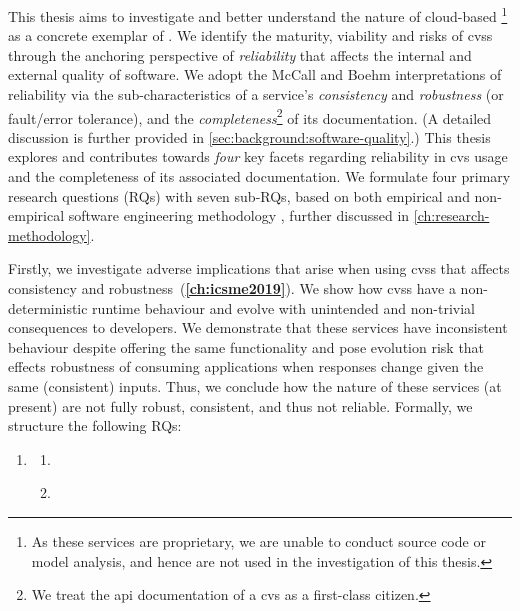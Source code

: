 This thesis aims to investigate and better understand the nature of cloud-based \footnote{As these services are proprietary, we are unable to conduct source code or model analysis, and hence are not used in the investigation of this thesis.} as a concrete exemplar of .
We identify the maturity, viability and risks of \glspl{cvs} through the anchoring perspective of \textit{reliability} that affects the internal and external quality of software. We adopt the McCall \citep{McCall:1977uy} and Boehm \citep{Boehm:1978vv} interpretations of reliability via the sub-characteristics of a service's \textit{consistency} and \textit{robustness} (or fault/error tolerance), and the \textit{completeness}\footnote{We treat the \gls{api} documentation of a \gls{cvs} as a first-class citizen.} of its documentation. (A detailed discussion is further provided in \cref{sec:background:software-quality}.)
This thesis explores and contributes towards \textit{four} key facets regarding reliability in \gls{cvs} usage and the completeness of its associated documentation. We formulate four primary research questions (RQs) with seven sub-RQs, based on both empirical and non-empirical software engineering methodology \citep{Simon:1996uw}, further discussed in \cref{ch:research-methodology}.

Firstly, we investigate adverse implications that arise when using \glspl{cvs} that affects consistency and robustness~(\textbf{\cref{ch:icsme2019}}). We show how \glspl{cvs} have a non-deterministic runtime behaviour and evolve with unintended and non-trivial consequences to developers. We demonstrate that these services have inconsistent behaviour despite offering the same functionality and pose evolution risk that effects robustness of consuming applications when responses change given the same (consistent) inputs. Thus, we conclude how the nature of these services (at present) are not fully robust, consistent, and thus not reliable. Formally, we structure the following RQs:

\begin{leftbar}
\begin{enumerate}[label=\faQuestionCircle~~\textbf{RQ\arabic*.}, ref=RQ\arabic*, leftmargin=2.5\parindent, rightmargin=1\parindent]
    \item \textbf{\RQOneTextLandscapeAnalysis{}}\label{rq:nature}
    \begin{enumerate}[label=\textit{RQ1.\arabic*.}, ref=RQ1.\arabic*]
      \item \RQOneTextLandscapeAnalysisRuntime{}\label{rq:nature:runtime}
      \item \RQOneTextLandscapeAnalysisEvolution{}\label{rq:nature:evolution}
    \end{enumerate}
\end{enumerate}
\end{leftbar}


